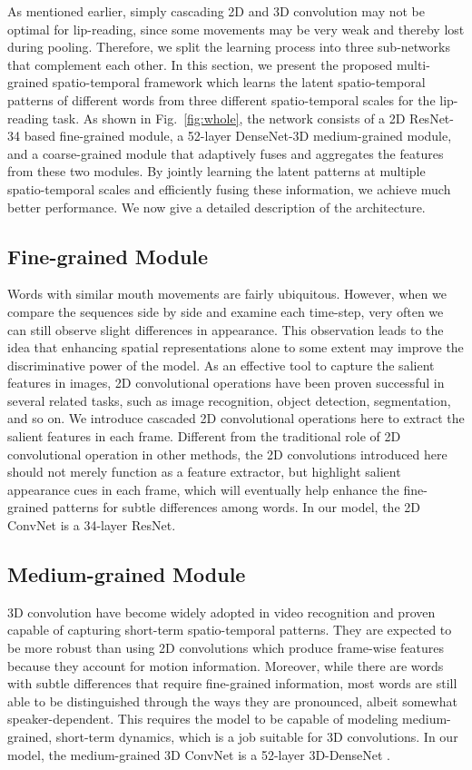 \documentclass{bmvc2k}
\begin{document}
As mentioned earlier, simply cascading 2D and 3D convolution may not be optimal for lip-reading, since some movements may be very weak and thereby lost during pooling. Therefore, we split the learning process into three sub-networks that complement each other. In this section, we present the proposed multi-grained spatio-temporal framework which learns the latent spatio-temporal patterns of different words from three different spatio-temporal scales for the lip-reading task. As shown in Fig.~\ref{fig:whole}, the network consists of a 2D ResNet-34 based fine-grained module, a 52-layer DenseNet-3D medium-grained module, and a coarse-grained module that adaptively fuses and aggregates the features from these two modules. By jointly learning the latent patterns at multiple spatio-temporal scales and efficiently fusing these information, we achieve much better performance. We now give a detailed description of the architecture.
\vspace{-1em}
\subsection{Fine-grained Module}
Words with similar mouth movements are fairly ubiquitous. However, when we compare the sequences side by side and examine each time-step, very often we can still observe slight differences in appearance. This observation leads to the idea that enhancing spatial representations alone to some extent may improve the discriminative power of the model. As an effective tool to capture the salient features in images, 2D convolutional operations have been proven successful in several related tasks, such as image recognition, object detection, segmentation, and so on. We introduce cascaded 2D convolutional operations here to extract the salient features in each frame. Different from the traditional role of 2D convolutional operation in other methods, the 2D convolutions introduced here should not merely function as a feature extractor, but highlight salient appearance cues in each frame, which will eventually help enhance the fine-grained patterns for subtle differences among words. In our model, the 2D ConvNet is a 34-layer ResNet.

\vspace{-1em}
\subsection{Medium-grained Module}
3D convolution have become widely adopted in video recognition and proven capable of capturing short-term spatio-temporal patterns. They are expected to be more robust than using 2D convolutions which produce frame-wise features because they account for motion information. Moreover, while there are words with subtle differences that require fine-grained information, most words are still able to be distinguished through the ways they are pronounced, albeit somewhat speaker-dependent. This requires the model to be capable of modeling medium-grained, short-term dynamics, which is a job suitable for 3D convolutions. In our model, the medium-grained 3D ConvNet is a 52-layer 3D-DenseNet \cite{yang2018lrw}.
\end{document}
